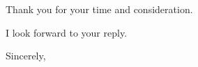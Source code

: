 \documentclass{letter}
\begin{document}
\begin{letter}
Thank you for your time and consideration.

I look forward to your reply.

\vspace{2\parskip} %
\closing{Sincerely,}
\vspace{2\parskip} %







\end{letter}

 
\end{document}
